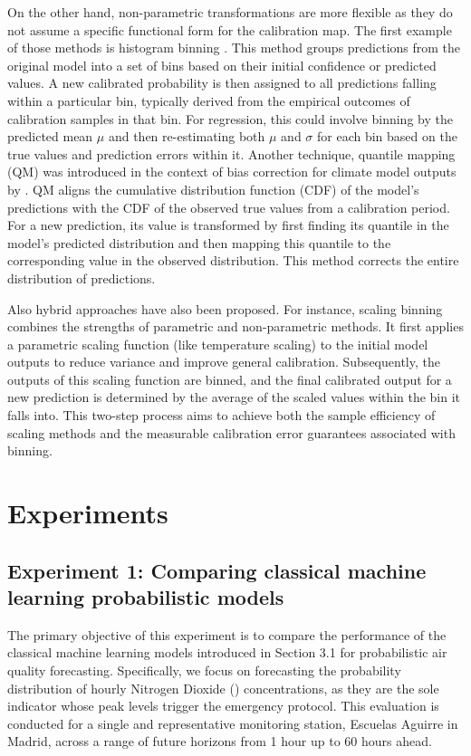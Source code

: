 \documentclass[12pt,a4paper]{book}
\begin{document}
On the other hand, non-parametric transformations are more flexible as they do not assume a specific functional form for the calibration map. The first example of those methods is histogram binning \citep{Zadrozny2001HB}. This method groups predictions from the original model into a set of bins based on their initial confidence or predicted values. A new calibrated probability is then assigned to all predictions falling within a particular bin, typically derived from the empirical outcomes of calibration samples in that bin. For regression, this could involve binning by the predicted mean $\mu$ and then re-estimating both $\mu$ and $\sigma$ for each bin based on the true values and prediction errors within it. 
Another technique, quantile mapping (QM) was introduced in the context of bias correction for climate model outputs by \citet{patel_quantile_2022}. QM aligns the cumulative distribution function (CDF) of the model's predictions with the CDF of the observed true values from a calibration period. For a new prediction, its value is transformed by first finding its quantile in the model's predicted distribution and then mapping this quantile to the corresponding value in the observed distribution. This method corrects the entire distribution of predictions. 

Also hybrid approaches have also been proposed. For instance, scaling binning \citep{kumar_verified_2020} combines the strengths of parametric and non-parametric methods. It first applies a parametric scaling function (like temperature scaling) to the initial model outputs to reduce variance and improve general calibration. Subsequently, the outputs of this scaling function are binned, and the final calibrated output for a new prediction is determined by the average of the scaled values within the bin it falls into. This two-step process aims to achieve both the sample efficiency of scaling methods and the measurable calibration error guarantees associated with binning.

\section{Experiments}

\subsection{Experiment 1: Comparing classical machine learning probabilistic models}

The primary objective of this experiment is to compare the performance of the classical machine learning models introduced in Section 3.1 for probabilistic air quality forecasting. Specifically, we focus on forecasting the probability distribution of hourly Nitrogen Dioxide (\no{}) concentrations, as they are the sole indicator whose peak levels trigger the emergency protocol. This evaluation is conducted for a single and representative monitoring station, Escuelas Aguirre in Madrid, across a range of future horizons from 1 hour up to 60 hours ahead.
\end{document}
